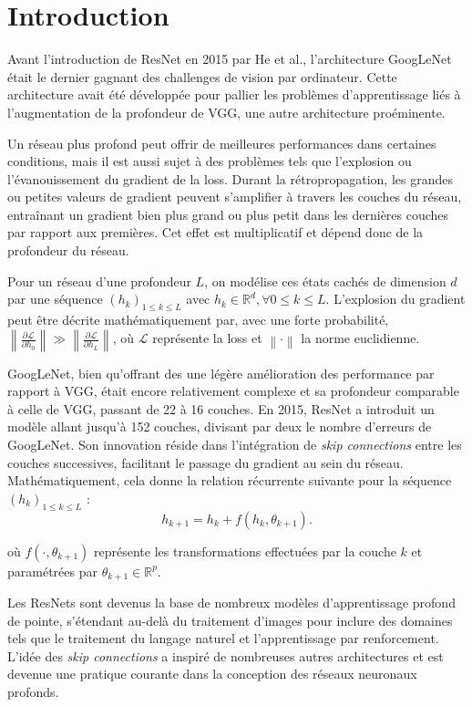 \chapter{Introduction}
Avant l'introduction de ResNet en 2015 par He et al., l'architecture GoogLeNet était le dernier gagnant des challenges de vision par ordinateur. Cette architecture avait été développée pour pallier les problèmes d'apprentissage liés à l'augmentation de la profondeur de VGG, une autre architecture proéminente.

Un réseau plus profond peut offrir de meilleures performances dans certaines conditions, mais il est aussi sujet à des problèmes tels que l'explosion ou l'évanouissement du gradient de la loss. Durant la rétropropagation, les grandes ou petites valeurs de gradient peuvent s'amplifier à travers les couches du réseau, entraînant un gradient bien plus grand ou plus petit dans les dernières couches par rapport aux premières. Cet effet est multiplicatif et dépend donc de la profondeur du réseau.

Pour un réseau d'une profondeur $L$, on modélise ces états cachés de dimension $d$ par une séquence $(h_k)_{1 \leq k \leq L}$ avec $h_k \in \mathbb{R}^d, \forall 0 \leq k \leq L$. L'explosion du gradient peut être décrite mathématiquement par, avec une forte probabilité, $\left\| \frac{\partial \mathcal{L}}{\partial h_0} \right\| \gg \left\| \frac{\partial \mathcal{L}}{\partial h_L} \right\|$, où $\mathcal{L}$ représente la loss et $\left\| \cdot \right\|$ la norme euclidienne.

GoogLeNet, bien qu'offrant des une légère amélioration des performance par rapport à VGG, était encore relativement complexe et sa profondeur comparable à celle de VGG, passant de 22 à 16 couches. En 2015, ResNet a introduit un modèle allant jusqu'à 152 couches, divisant par deux le nombre d'erreurs de GoogLeNet. Son innovation réside dans l'intégration de \textit{skip connections} entre les couches successives, facilitant le passage du gradient au sein du réseau. Mathématiquement, cela donne la relation récurrente suivante pour la séquence $(h_k)_{1 \leq k \leq L}$ :
\[
    h_{k+1} = h_k + f(h_k, \theta_{k+1})
.\]

où $f(\cdot, \theta_{k+1})$ représente les transformations effectuées par la couche $k$ et paramétrées par $\theta_{k+1} \in \mathbb{R}^p$.

Les ResNets sont devenus la base de nombreux modèles d'apprentissage profond de pointe, s'étendant au-delà du traitement d'images pour inclure des domaines tels que le traitement du langage naturel et l'apprentissage par renforcement. L'idée des \textit{skip connections} a inspiré de nombreuses autres architectures et est devenue une pratique courante dans la conception des réseaux neuronaux profonds.

